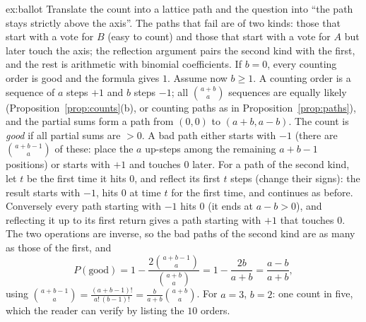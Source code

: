 \begin{solution}{ex:ballot}
\idea Translate the count into a lattice path and the question into ``the path stays strictly above the axis''. The paths that fail are of two kinds: those that start with a vote for $B$ (easy to count) and those that start with a vote for $A$ but later touch the axis; the reflection argument pairs the second kind with the first, and the rest is arithmetic with binomial coefficients.
\writeup If $b=0$, every counting order is good and the formula gives $1$. Assume now $b\ge1$. A counting order is a sequence of $a$ steps $+1$ and $b$ steps $-1$; all $\binom{a+b}a$ sequences are equally likely (Proposition~\ref{prop:counts}(b), or counting paths as in Proposition~\ref{prop:paths}), and the partial sums form a path from $(0,0)$ to $(a+b,a-b)$. The count is \emph{good} if all partial sums are $>0$. A bad path either starts with $-1$ (there are $\binom{a+b-1}a$ of these: place the $a$ up-steps among the remaining $a+b-1$ positions) or starts with $+1$ and touches $0$ later. For a path of the second kind, let $t$ be the first time it hits $0$, and reflect its first $t$ steps (change their signs): the result starts with $-1$, hits $0$ at time $t$ for the first time, and continues as before. Conversely every path starting with $-1$ hits $0$ (it ends at $a-b>0$), and reflecting it up to its first return gives a path starting with $+1$ that touches $0$. The two operations are inverse, so the bad paths of the second kind are as many as those of the first, and
\[
P(\text{good})=1-\frac{2\binom{a+b-1}a}{\binom{a+b}a}=1-\frac{2b}{a+b}=\frac{a-b}{a+b},
\]
using $\binom{a+b-1}a=\frac{(a+b-1)!}{a!\,(b-1)!}=\frac b{a+b}\binom{a+b}a$. For $a=3$, $b=2$: one count in five, which the reader can verify by listing the $10$ orders.
\end{solution}

